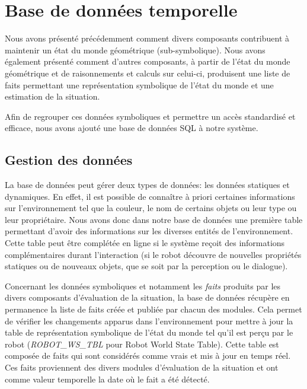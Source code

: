 \documentclass[a4paper,11pt,twoside]{StyleThese}
\begin{document}
\section{Base de données temporelle}
\label{sec:db}
Nous avons présenté précédemment comment divers composants contribuent à maintenir un état du monde géométrique (sub-symbolique). Nous avons également présenté comment d'autres composants, à partir de l'état du monde géométrique et de raisonnements et calculs sur celui-ci, produisent une liste de faits permettant une représentation symbolique de l'état du monde et une estimation de la situation.

Afin de regrouper ces données symboliques et permettre un accès standardisé et efficace, nous avons ajouté une base de données SQL à notre système.

\subsection{Gestion des données}
\label{sec:dbd}
La base de données peut gérer deux types de données: les données statiques et dynamiques. En effet, il est possible de connaître à priori certaines informations sur l'environnement tel que la couleur, le nom de certains objets ou leur type ou leur propriétaire. 
Nous avons donc dans notre base de données une première table permettant d'avoir des informations sur les diverses entités de l'environnement. Cette table peut être complétée en ligne si le système reçoit des informations complémentaires durant l'interaction (si le robot découvre de nouvelles propriétés statiques ou de nouveaux objets, que se soit par la perception ou le dialogue).

Concernant les données symboliques et notamment les \textit{faits} produits par les divers composants d'évaluation de la situation, la base de données récupère en permanence la liste de faits créée et publiée par chacun des modules. Cela permet de vérifier les changements apparus dans l'environnement pour mettre à jour la table de représentation symbolique de l'état du monde tel qu'il est perçu par le robot (\textit{ROBOT\_WS\_TBL} pour Robot World State Table).
Cette table est composée de faits qui sont considérés comme vrais et mis à jour en temps réel. Ces faits proviennent des divers modules d'évaluation de la situation et ont comme valeur temporelle la date où le fait a été détecté.

\end{document}
